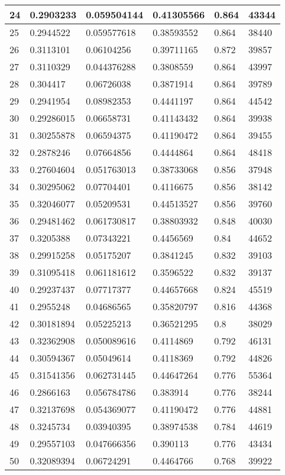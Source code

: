 \begin{longtable}{|l|l|l|l|l|l|}
24 & 0.2903233 & 0.059504144 & 0.41305566 & 0.864 & 43344 \\ \hline 
25 & 0.2944522 & 0.059577618 & 0.38593552 & 0.864 & 38440 \\ \hline 
26 & 0.3113101 & 0.06104256 & 0.39711165 & 0.872 & 39857 \\ \hline 
27 & 0.3110329 & 0.044376288 & 0.3808559 & 0.864 & 43997 \\ \hline 
28 & 0.304417 & 0.06726038 & 0.3871914 & 0.864 & 39789 \\ \hline 
29 & 0.2941954 & 0.08982353 & 0.4441197 & 0.864 & 44542 \\ \hline 
30 & 0.29286015 & 0.06658731 & 0.41143432 & 0.864 & 39938 \\ \hline 
31 & 0.30255878 & 0.06594375 & 0.41190472 & 0.864 & 39455 \\ \hline 
32 & 0.2878246 & 0.07664856 & 0.4444864 & 0.864 & 48418 \\ \hline 
33 & 0.27604604 & 0.051763013 & 0.38733068 & 0.856 & 37948 \\ \hline 
34 & 0.30295062 & 0.07704401 & 0.4116675 & 0.856 & 38142 \\ \hline 
35 & 0.32046077 & 0.05209531 & 0.44513527 & 0.856 & 39760 \\ \hline 
36 & 0.29481462 & 0.061730817 & 0.38803932 & 0.848 & 40030 \\ \hline 
37 & 0.3205388 & 0.07343221 & 0.4456569 & 0.84 & 44652 \\ \hline 
38 & 0.29915258 & 0.05175207 & 0.3841245 & 0.832 & 39103 \\ \hline 
39 & 0.31095418 & 0.061181612 & 0.3596522 & 0.832 & 39137 \\ \hline 
40 & 0.29237437 & 0.07717377 & 0.44657668 & 0.824 & 45519 \\ \hline 
41 & 0.2955248 & 0.04686565 & 0.35820797 & 0.816 & 44368 \\ \hline 
42 & 0.30181894 & 0.05225213 & 0.36521295 & 0.8 & 38029 \\ \hline 
43 & 0.32362908 & 0.050089616 & 0.4114869 & 0.792 & 46131 \\ \hline 
44 & 0.30594367 & 0.05049614 & 0.4118369 & 0.792 & 44826 \\ \hline 
45 & 0.31541356 & 0.062731445 & 0.44647264 & 0.776 & 55364 \\ \hline 
46 & 0.2866163 & 0.056784786 & 0.383914 & 0.776 & 38244 \\ \hline 
47 & 0.32137698 & 0.054369077 & 0.41190472 & 0.776 & 44881 \\ \hline 
48 & 0.3245734 & 0.03940395 & 0.38974538 & 0.784 & 44619 \\ \hline 
49 & 0.29557103 & 0.047666356 & 0.390113 & 0.776 & 43434 \\ \hline 
50 & 0.32089394 & 0.06724291 & 0.4464766 & 0.768 & 39922 \\ \hline 
\end{longtable}